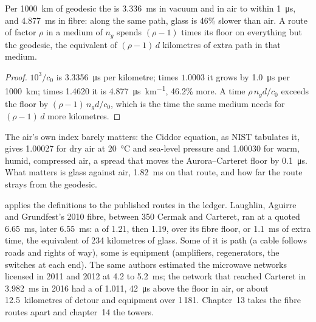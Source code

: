 \begin{proposition}\label{prop:nw:the-north-american-map:floors}
Per \qty{1000}{\kilo\metre} of geodesic the  is \qty{3.336}{\milli\second} in vacuum and in air to within
\qty{1}{\micro\second}, and \qty{4.877}{\milli\second} in fibre: along the same path, glass is 46\% slower than air.
A route of factor $\rho$ in a medium of  $n_g$ spends $(\rho - 1)$ times its floor on everything but the geodesic, the equivalent of
$(\rho - 1)\,d$ kilometres of extra path in that medium.
\end{proposition}

\begin{proof}
$10^3/c_0$ is \qty{3.3356}{\micro\second} per kilometre; times $1.0003$ it grows by \qty{1.0}{\micro\second} per \qty{1000}{\kilo\metre}; times
1.4620 it is \qty{4.877}{\micro\second\per\kilo\metre}, 46.2\% more. A time $\rho\, n_g d / c_0$ exceeds the floor by $(\rho-1)\,n_g d/c_0$,
which is the time the same medium needs for $(\rho-1)\,d$ more kilometres.
\end{proof}

The air's own index barely matters: the Ciddor equation, as NIST tabulates it, gives 1.00027 for dry air at \qty{20}{\celsius} and
sea-level pressure and 1.00030 for warm, humid, compressed air, a spread that moves the Aurora--Carteret floor by \qty{0.1}{\micro\second}.
What matters is glass against air, \qty{1.82}{\milli\second} on that route, and how far the route strays from the geodesic.

\label{lst:nw:the-north-american-map:floor}

 applies the definitions to the published routes in the ledger. Laughlin, Aguirre and Grundfest's
2010 fibre, between 350 Cermak and Carteret, ran at a quoted \qty{6.65}{\milli\second}, later \qty{6.55}{\milli\second}: a  of 1.21,
then 1.19, over its fibre floor, or \qty{1.1}{\milli\second} of extra time, the equivalent of 234 kilometres of glass. Some of it is path (a
cable follows roads and rights of way), some is equipment (amplifiers, regenerators, the switches at each end). The same authors estimated the
microwave networks licensed in 2011 and 2012 at 4.2 to \qty{5.2}{\milli\second}; the network that reached Carteret in \qty{3.982}{\milli\second}
in 2016 had a  of 1.011, \qty{42}{\micro\second} above the floor in air, or about 12.5~kilometres of detour and equipment over
1\,181. Chapter~13 takes the fibre routes apart and chapter~14 the towers.

